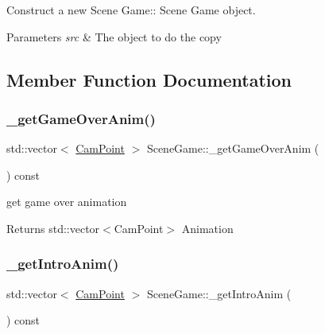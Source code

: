 Construct a new Scene Game\+:\+: Scene Game object. 


\begin{DoxyParams}{Parameters}
{\em src} & The object to do the copy \\
\hline
\end{DoxyParams}


\subsection{Member Function Documentation}
\mbox{\label{class_scene_game_a02e7d9b9c93aec9665c9235ddfb212f5}} 
\subsubsection{\texorpdfstring{\+\_\+get\+Game\+Over\+Anim()}{\_getGameOverAnim()}}
{\footnotesize\ttfamily std\+::vector$<$ \hyperlink{struct_cam_point}{Cam\+Point} $>$ Scene\+Game\+::\+\_\+get\+Game\+Over\+Anim (\begin{DoxyParamCaption}{ }\end{DoxyParamCaption}) const\hspace{0.3cm}{\ttfamily [protected]}}



get game over animation 

\begin{DoxyReturn}{Returns}
std\+::vector$<$\+Cam\+Point$>$ Animation 
\end{DoxyReturn}
\mbox{\label{class_scene_game_ac94a0aea8920b1a1dc4324a25c2d102d}} 
\subsubsection{\texorpdfstring{\+\_\+get\+Intro\+Anim()}{\_getIntroAnim()}}
{\footnotesize\ttfamily std\+::vector$<$ \hyperlink{struct_cam_point}{Cam\+Point} $>$ Scene\+Game\+::\+\_\+get\+Intro\+Anim (\begin{DoxyParamCaption}{ }\end{DoxyParamCaption}) const\hspace{0.3cm}{\ttfamily [protected]}}



